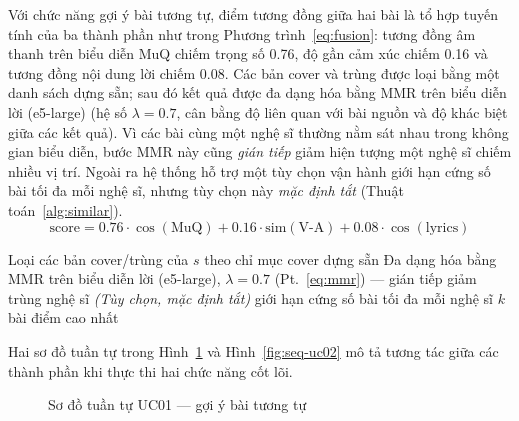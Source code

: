 \documentclass[../DoAn.tex]{subfiles}
\begin{document}
Với chức năng gợi ý bài tương tự, điểm tương đồng giữa hai bài là tổ hợp tuyến tính của ba thành phần như trong Phương trình~\eqref{eq:fusion}: tương đồng âm thanh trên biểu diễn MuQ chiếm trọng số 0.76, độ gần cảm xúc chiếm 0.16 và tương đồng nội dung lời chiếm 0.08. Các bản cover và trùng được loại bằng một danh sách dựng sẵn; sau đó kết quả được đa dạng hóa bằng MMR \cite{carbonell1998mmr} trên biểu diễn lời (e5-large) (hệ số $\lambda = 0.7$, cân bằng độ liên quan với bài nguồn và độ khác biệt giữa các kết quả). Vì các bài cùng một nghệ sĩ thường nằm sát nhau trong không gian biểu diễn, bước MMR này cũng \textit{gián tiếp} giảm hiện tượng một nghệ sĩ chiếm nhiều vị trí. Ngoài ra hệ thống hỗ trợ một tùy chọn vận hành giới hạn cứng số bài tối đa mỗi nghệ sĩ, nhưng tùy chọn này \textit{mặc định tắt} (Thuật toán~\ref{alg:similar}).
\begin{equation}\label{eq:fusion}
    \text{score} = 0.76 \cdot \cos(\text{MuQ}) + 0.16 \cdot \text{sim}(\text{V-A}) + 0.08 \cdot \cos(\text{lyrics})
\end{equation}

\begin{algorithm}[h]
\caption{Gợi ý bài hát tương tự}
\label{alg:similar}
Loại các bản cover/trùng của $s$ theo chỉ mục cover dựng sẵn\;
Đa dạng hóa bằng MMR trên biểu diễn lời (e5-large), $\lambda = 0.7$ (Pt.~\eqref{eq:mmr}) --- gián tiếp giảm trùng nghệ sĩ\;
\textit{(Tùy chọn, mặc định tắt)} giới hạn cứng số bài tối đa mỗi nghệ sĩ\;
\Return $k$ bài điểm cao nhất\;
\end{algorithm}

Hai sơ đồ tuần tự trong Hình~\ref{fig:seq-uc01} và Hình~\ref{fig:seq-uc02} mô tả tương tác giữa các thành phần khi thực thi hai chức năng cốt lõi.

\begin{figure}[h!]
\centering
{}
\caption{Sơ đồ tuần tự UC01 --- gợi ý bài tương tự}
\label{fig:seq-uc01}
\end{figure}
\end{document}
